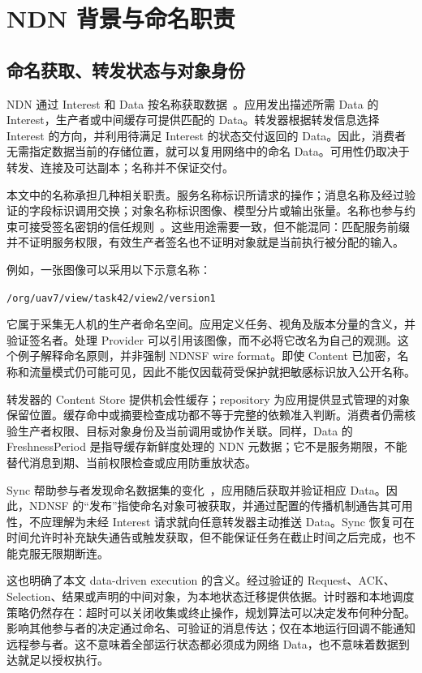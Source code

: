 \section{NDN 背景与命名职责}
\subsection{命名获取、转发状态与对象身份}
NDN 通过 Interest 和 Data 按名称获取数据~\cite{ndn,ndnpacket}。应用发出描述所需 Data 的 Interest，生产者或中间缓存可提供匹配的 Data。转发器根据转发信息选择 Interest 的方向，并利用待满足 Interest 的状态交付返回的 Data。因此，消费者无需指定数据当前的存储位置，就可以复用网络中的命名 Data。可用性仍取决于转发、连接及可达副本；名称并不保证交付。

本文中的名称承担几种相关职责。服务名称标识所请求的操作；消息名称及经过验证的字段标识调用交换；对象名称标识图像、模型分片或输出张量。名称也参与约束可接受签名密钥的信任规则~\cite{trustschema}。这些用途需要一致，但不能混同：匹配服务前缀并不证明服务权限，有效生产者签名也不证明对象就是当前执行被分配的输入。

例如，一张图像可以采用以下示意名称：
\begin{center}\texttt{/org/uav7/view/task42/view2/version1}\end{center}
它属于采集无人机的生产者命名空间。应用定义任务、视角及版本分量的含义，并验证签名者。处理 Provider 可以引用该图像，而不必将它改名为自己的观测。这个例子解释命名原则，并非强制 NDNSF wire format。即使 Content 已加密，名称和流量模式仍可能可见，因此不能仅因载荷受保护就把敏感标识放入公开名称。

转发器的 Content Store 提供机会性缓存；repository 为应用提供显式管理的对象保留位置。缓存命中或摘要检查成功都不等于完整的依赖准入判断。消费者仍需核验生产者权限、目标对象身份及当前调用或协作关联。同样，Data 的 FreshnessPeriod 是指导缓存新鲜度处理的 NDN 元数据；它不是服务期限，不能替代消息到期、当前权限检查或应用防重放状态。

Sync 帮助参与者发现命名数据集的变化~\cite{li2018brief,moll2022sok}，应用随后获取并验证相应 Data。因此，NDNSF 的“发布”指使命名对象可被获取，并通过配置的传播机制通告其可用性，不应理解为未经 Interest 请求就向任意转发器主动推送 Data。Sync 恢复可在时间允许时补充缺失通告或触发获取，但不能保证任务在截止时间之后完成，也不能克服无限期断连。

这也明确了本文 data-driven execution 的含义。经过验证的 Request、ACK、Selection、结果或声明的中间对象，为本地状态迁移提供依据。计时器和本地调度策略仍然存在：超时可以关闭收集或终止操作，规划算法可以决定发布何种分配。影响其他参与者的决定通过命名、可验证的消息传达；仅在本地运行回调不能通知远程参与者。这不意味着全部运行状态都必须成为网络 Data，也不意味着数据到达就足以授权执行。

